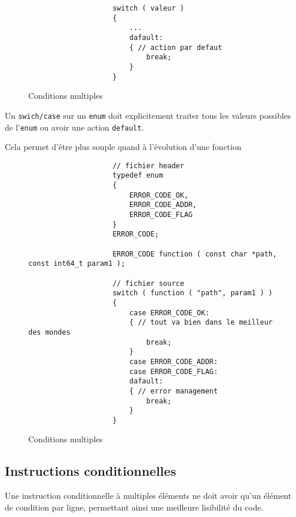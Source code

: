 			\begin{figure}[H]
				\begin{changemargin}{-2.5cm}{-2.5cm}
				\begin{tcolorbox}
				\begin{verbatim}
					switch ( valeur )
					{
					    ...
					    dafault:
					    { // action par defaut
					        break;
					    }
					}
				\end{verbatim}
				\end{tcolorbox}
				\end{changemargin}
				\caption{Conditions multiples}
			\end{figure}

			Un \verb+swich/case+ sur un \verb+enum+ doit explicitement traiter tous les valeurs possibles de l'\verb+enum+ ou avoir une action \verb+default+.

			Cela permet d’être plus souple quand à l'évolution d'une fonction

			\begin{figure}[H]
				\begin{changemargin}{-2.5cm}{-2.5cm}
				\begin{tcolorbox}
				\begin{verbatim}
					// fichier header
					typedef enum
					{
					    ERROR_CODE_OK,
					    ERROR_CODE_ADDR,
					    ERROR_CODE_FLAG
					}
					ERROR_CODE;

					ERROR_CODE function ( const char *path, const int64_t param1 );

					// fichier source
					switch ( function ( "path", param1 ) )
					{
					    case ERROR_CODE_OK:
					    { // tout va bien dans le meilleur des mondes
					        break;
					    }
					    case ERROR_CODE_ADDR:
					    case ERROR_CODE_FLAG:
					    dafault:
					    { // error management
					        break;
					    }
					}
				\end{verbatim}
				\end{tcolorbox}
				\end{changemargin}
				\caption{Conditions multiples}
			\end{figure}

		\subsection{Instructions conditionnelles}
			Une instruction conditionnelle à multiples éléments ne doit avoir qu'un élément de condition par ligne, permettant ainsi une meilleure lisibilité du code.

